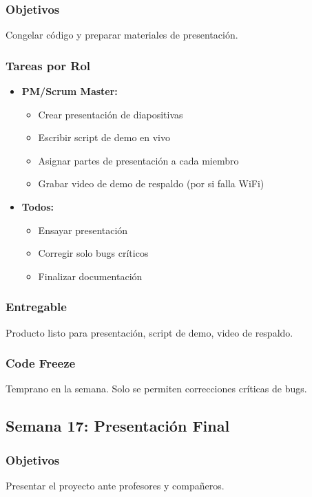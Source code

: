 \documentclass[12pt,a4paper]{article}
\begin{document}
\subsubsection{Objetivos}
Congelar código y preparar materiales de presentación.

\subsubsection{Tareas por Rol}

\begin{itemize}[leftmargin=*]
    \item \textbf{PM/Scrum Master:}
    \begin{itemize}
        \item Crear presentación de diapositivas
        \item Escribir script de demo en vivo
        \item Asignar partes de presentación a cada miembro
        \item Grabar video de demo de respaldo (por si falla WiFi)
    \end{itemize}
    
    \item \textbf{Todos:}
    \begin{itemize}
        \item Ensayar presentación
        \item Corregir solo bugs críticos
        \item Finalizar documentación
    \end{itemize}
\end{itemize}

\subsubsection{Entregable}
Producto listo para presentación, script de demo, video de respaldo.

\subsubsection{Code Freeze}
Temprano en la semana. Solo se permiten correcciones críticas de bugs.

\subsection{Semana 17: Presentación Final}

\subsubsection{Objetivos}
Presentar el proyecto ante profesores y compañeros.
\end{document}
